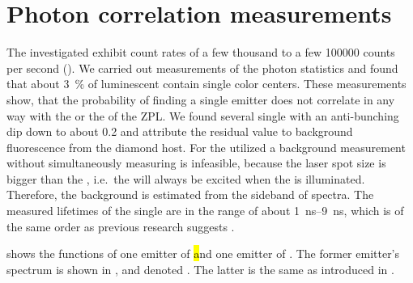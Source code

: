 
	\section{Photon correlation measurements} \label{subsec::g2}

		The investigated \sivs exhibit count rates of a few thousand to a few \num{100000} counts per second (\SI{}{\cps}).
		We carried out measurements of the photon statistics and found that about \SI{3}{\percent} of luminescent \nds contain single color centers.
		These measurements show, that the probability of finding a single emitter does not correlate in any way with the \cwl or the \lw of the ZPL.
		We found several single \sivs with an anti-bunching dip down to about \num{0.2} and attribute the residual \gtz value to background fluorescence from the diamond host.
		For the utilized \nds a background measurement without simultaneously measuring \siv \pl is infeasible, because the laser spot size is bigger than the \nd, i.e.\ the \siv will always be excited when the \nd is illuminated.
		Therefore, the background is estimated from the sideband of \siv spectra.
		The measured lifetimes of the single \sivs are in the range of about \SIrange{1}{9}{\ns}, which is of the same order as previous research suggests \cite{Sipahigil2014,Sternschulte1994}.

		 shows the \gt functions of one emitter of \hl and one emitter of \vl.
		The former emitter's spectrum is shown in , and denoted \emhtwo. The latter is the same as \embroad introduced in .

